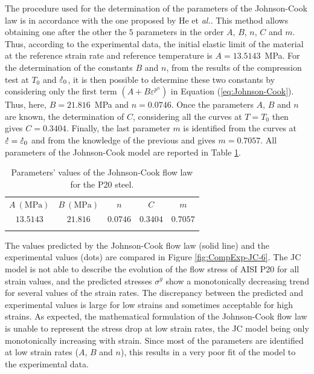 \documentclass[twoside,english,1p,final,sort&compress]{elsarticle}
\makeatletter
\theoremstyle{plain}
\DeclareRobustCommand{\mdot}[1]{\accentset{\mbox{\bfseries .}}{#1}}
\DeclareRobustCommand{\eal}{et \emph{al.}\@\xspace}
\makeatother
\begin{document}
The procedure used for the determination of the parameters of the Johnson-Cook law is in accordance with the one proposed by He \eal \cite{He-2013}.
This method allows obtaining one after the other the $5$ parameters in the order $A$, $B$, $n$, $C$ and $m$.
Thus, according to the experimental data, the initial elastic limit of the material at the reference strain rate and reference temperature is $A=13.5143$~MPa.
For the determination of the constants $B$ and $n$, from the results of the compression test at $T_0$ and $\mdot\varepsilon_0$, it is then possible to determine these two constants by considering only the first term $\left(A+B\varepsilon^{p^{n}}\right)$ in Equation (\ref{eq:Johnson-Cook}).
Thus, here, $B=21.816$~MPa and $n=0.0746$.
Once the parameters $A$, $B$ and $n$ are known, the determination of $C$, considering all the curves at $T=T_0$ then gives $C=0.3404$.
Finally, the last parameter $m$ is identified from the curves at $\mdot\varepsilon=\mdot\varepsilon_0$ and from the knowledge of the previous and gives $m=0.7057$.
All parameters of the Johnson-Cook model are reported in Table \ref{tab:JC}.

\begin{table}[h!]
\centering
\caption{Parameters' values of the Johnson-Cook flow law for the P20 steel.}
\begin{tabular}{ccccc}
\hline
$A~(\text{MPa})$ & $B~(\text{MPa})$ & $n$ & $C$ & $m$\\
$13.5143$&$21.816$&$0.0746$&$0.3404$&$0.7057$\\ \hline
\label{tab:JC}
\end{tabular}
\end{table}

The values predicted by the Johnson-Cook flow law (solid line) and the experimental values (dots) are compared in Figure \ref{fig:CompExp-JC-6}.
The JC model is not able to describe the evolution of the flow stress of AISI P20 for all strain values, and the predicted stresses $\sigma^y$ show a monotonically decreasing trend for several values of the strain rates.
The discrepancy between the predicted and experimental values is large for low strains and sometimes acceptable for high strains.
As expected, the mathematical formulation of the Johnson-Cook flow law is unable to represent the stress drop at low strain rates, the JC model being only monotonically increasing with strain.
Since most of the parameters are identified at low strain rates ($A$, $B$ and $n$), this results in a very poor fit of the model to the experimental data.
\end{document}
